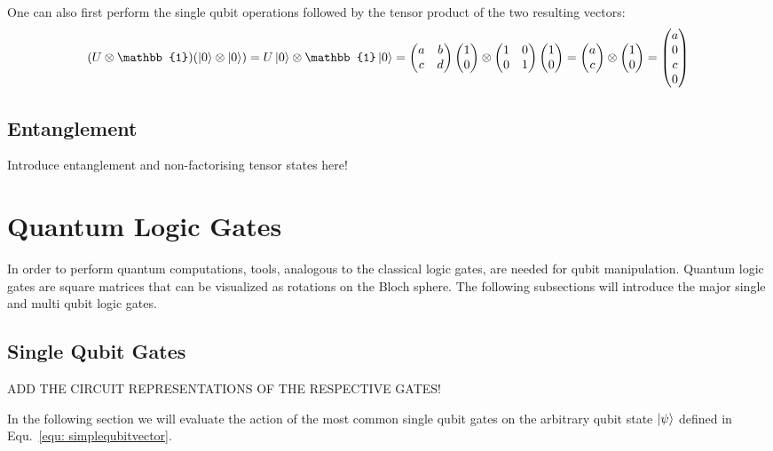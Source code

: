 One can also first perform the single qubit operations followed by the tensor product of the two resulting vectors:
\begin{equation}
\label{equ:2qubitlineartransform2}
(U \otimes \mathbb{1})(\ket{0} \otimes \ket{0})= U\ket{0} \otimes \mathbb{1}\ket{0} = \begin{pmatrix}
 a & b \\ 
 c & d
 \end{pmatrix} \colvec{1\\0} \otimes \begin{pmatrix}
 1 & 0 \\ 
 0 & 1
 \end{pmatrix} \colvec{1\\0} = \colvec{a\\c} \otimes \colvec{1\\0} = \colvec{a\\0\\c\\0}
\end{equation}

\subsection{Entanglement}
\label{subsec:entanglement}

Introduce entanglement and non-factorising tensor states here!



\section{Quantum Logic Gates}
\label{subsec:quantumlogicgates}
In order to perform quantum computations, tools, analogous to the classical logic gates, are needed for qubit manipulation. Quantum logic gates are square matrices that can be visualized as rotations on the Bloch sphere. The following subsections will introduce the major single and multi qubit logic gates.

\subsection{Single Qubit Gates}
\label{subsubsec:singlequbitgates}

ADD THE CIRCUIT REPRESENTATIONS OF THE RESPECTIVE GATES!

In the following section we will evaluate the action of the most common single qubit gates on the arbitrary qubit state $\ket{\psi}$ defined in Equ.~\ref{equ: simplequbitvector}.

